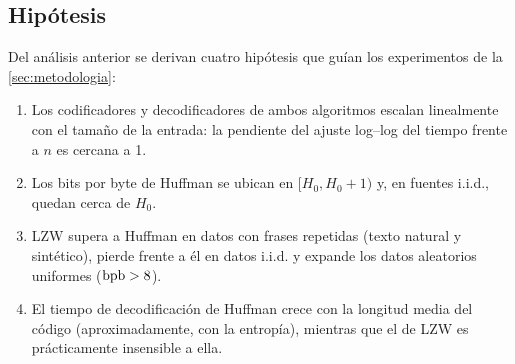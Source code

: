\subsection{Hipótesis}
\label{sec:hipotesis}
Del análisis anterior se derivan cuatro hipótesis que guían los experimentos de la
\cref{sec:metodologia}:
\begin{enumerate}[label=\textbf{H\arabic*.}, leftmargin=*]
  \item \label{hip:h1} Los codificadores y decodificadores de ambos algoritmos escalan
        linealmente con el tamaño de la entrada: la pendiente del ajuste log--log del tiempo
        frente a $n$ es cercana a 1.
  \item \label{hip:h2} Los bits por byte de Huffman se ubican en $[H_0, H_0 + 1)$ y, en fuentes
        i.i.d., quedan cerca de $H_0$.
  \item \label{hip:h3} LZW supera a Huffman en datos con frases repetidas (texto natural y
        sintético), pierde frente a él en datos i.i.d. y expande los datos aleatorios
        uniformes ($\mathrm{bpb} > 8$).
  \item \label{hip:h4} El tiempo de decodificación de Huffman crece con la longitud media del
        código (aproximadamente, con la entropía), mientras que el de LZW es prácticamente
        insensible a ella.
\end{enumerate}
